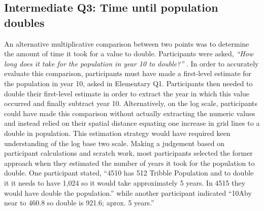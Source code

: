 \documentclass[print]{nuthesis}
\begin{document}
\hypertarget{intermediate-q3-time-until-population-doubles}{%
\subsection{Intermediate Q3: Time until population doubles}\label{intermediate-q3-time-until-population-doubles}}

An alternative multiplicative comparison between two points was to determine the amount of time it took for a value to double.
Participants were asked, \emph{``How long does it take for the population in year 10 to double?''} .
In order to accurately evaluate this comparison, participants must have made a first-level estimate for the population in year 10, asked in Elementary Q1.
Participants then needed to double their first-level estimate in order to extract the year in which this value occurred and finally subtract year 10.
Alternatively, on the log scale, participants could have made this comparison without actually extracting the numeric values and instead relied on their spatial distance equating one increase in grid lines to a double in population.
This estimation strategy would have required keen understanding of the log base two scale.
Making a judgement based on participant calculations and scratch work, most participants selected the former approach when they estimated the number of years it took for the population to double.
One participant stated, ``4510 has 512 Tribble Population and to double it it needs to have 1,024 so it would take approximately 5 years. In 4515 they would have double the population.'' while another participant indicated ``10Aby near to 460.8 so double is 921.6; aprox. 5 years.''
\end{document}

